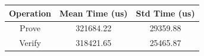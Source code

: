 \begin{tabular}{ccc}
\hline
Operation & Mean Time (us) & Std Time (us) \\
\hline
Prove & 321684.22 & 29359.88 \\
Verify & 318421.65 & 25465.87 \\
\hline
\end{tabular}
